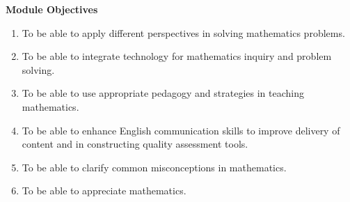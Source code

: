 \documentclass[10pt,a4paper]{report}
\begin{document}
\begin{titlepage}
\begin{center}
{\LARGE\bfseries Module Objectives}
\begin{enumerate}
\item To be able to apply different perspectives in solving mathematics
problems.
\item To be able to integrate technology for mathematics inquiry and problem
solving.
\item To be able to use appropriate pedagogy and strategies in teaching
mathematics.
\item To be able to enhance English communication skills to improve delivery
of content and in constructing quality assessment tools.
\item To be able to clarify common misconceptions in mathematics.
\item To be able to appreciate mathematics.
\end{enumerate}
\end{center}
\end{titlepage}
\thispagestyle{empty}
\tableofcontents
\thispagestyle{empty}
\pagestyle{fancy}







\nocite{*}
\printbibheading
\printbibliography[keyword=Module1,heading=subbibliography,title={Module 1}]
\printbibliography[keyword=Module2,heading=subbibliography,title={Module 2}]
\printbibliography[keyword=Module3,heading=subbibliography,title={Module 3}]
\printbibliography[keyword=Module4,heading=subbibliography,title={Module 4}]
\printbibliography[keyword=Module5,heading=subbibliography,title={Module 5}]
\printbibliography[keyword=Module6,heading=subbibliography,title={Module 6}]
\printindex
\end{document}
